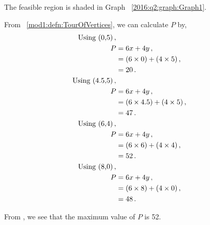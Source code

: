 \begin{subquestions}
\begin{subsubquestions}
The feasible region is shaded in Graph ~\ref{2016:q2:graph:Graph1}.


\subsubquestion

From ~\ref{mod1:defn:TourOfVertices}, we can calculate $P$ by,
\begin{align}
	\text{Using (0,5)} \,, \nonumber \\
	P & = 6x + 4y \,, \nonumber \\
      & = (6 \times 0) + (4 \times 5) \,, \nonumber \\
	  & = 20 \,. \\
	\text{Using (4.5,5)} \,, \nonumber \\
	P & = 6x + 4y \,, \nonumber \\
	  & = (6 \times 4.5) + (4 \times 5) \,, \nonumber \\
	  & = 47 \,.    \\		  
	\text{Using (6,4)} \,, \nonumber \\
	P & = 6x + 4y \,, \nonumber \\
	  & = (6 \times 6) + (4 \times 4) \,, \nonumber \\
	  & = 52 \,. \label{2016:q2:eqn:Profit} \\
	\text{Using (8,0)} \,, \nonumber \\
	P & = 6x + 4y \,, \nonumber \\
	  & = (6 \times 8) + (4 \times 0) \,, \nonumber \\
	  & = 48 \,. 
\end{align}

From , we see that the maximum value of $P$ is 52.

\end{subsubquestions}


\subquestion

\begin{subsubquestions}
	
\subsubquestion


\end{subsubquestions}
\end{subquestions}

